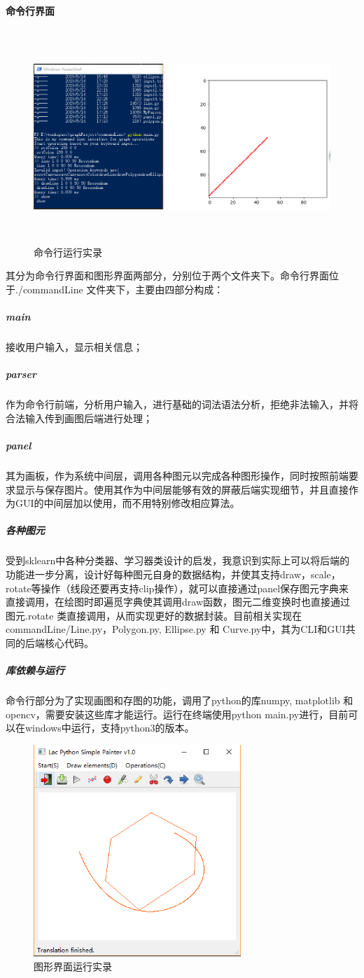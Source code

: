 \documentclass[a4paper,UTF8]{article}
\theoremstyle{definition}
\begin{document}
\paragraph{命令行界面} 
\begin{figure}
	\centering
	\includegraphics[height=8cm]{commandLineScrot.jpg}
	\caption{命令行运行实录}
	\label{commandLineLooklike}
\end{figure}
其分为命令行界面和图形界面两部分，分别位于两个文件夹下。命令行界面位于./commandLine 文件夹下，主要由四部分构成：
\subparagraph{main} 接收用户输入，显示相关信息；
\subparagraph{parser} 作为命令行前端，分析用户输入，进行基础的词法语法分析，拒绝非法输入，并将合法输入传到画图后端进行处理；
\subparagraph{panel} 其为画板，作为系统中间层，调用各种图元以完成各种图形操作，同时按照前端要求显示与保存图片。使用其作为中间层能够有效的屏蔽后端实现细节，并且直接作为GUI的中间层加以使用，而不用特别修改相应算法。
\subparagraph{各种图元} 受到sklearn中各种分类器、学习器类设计的启发，我意识到实际上可以将后端的功能进一步分离，设计好每种图元自身的数据结构，并使其支持draw，scale，rotate等操作（线段还要再支持clip操作），就可以直接通过panel保存图元字典来直接调用，在绘图时即遍觅字典使其调用draw函数，图元二维变换时也直接通过图元.rotate 类直接调用，从而实现更好的数据封装。目前相关实现在commandLine/Line.py，Polygon.py, Ellipse.py 和 Curve.py中，其为CLI和GUI共同的后端核心代码。
\subparagraph{库依赖与运行} 命令行部分为了实现画图和存图的功能，调用了python的库numpy, matplotlib 和opencv，需要安装这些库才能运行。运行在终端使用python main.py进行，目前可以在windows中运行，支持python3的版本。
\begin{figure}
	\centering
	\includegraphics[height=8cm]{guiScrot.jpg}
	\caption{图形界面运行实录}
	\label{guiLooklike}
\end{figure}
\end{document}

